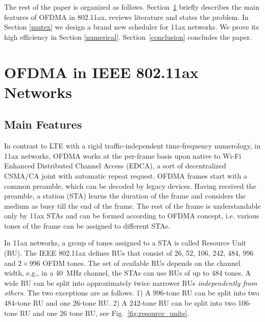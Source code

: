 The rest of the paper is organized as follows.
Section~\ref{sec:ofdma} briefly describes the main features of OFDMA in 802.11ax, reviews literature and states the problem.
In Section \ref{mutex} we design a brand new scheduler for 11ax networks.
We prove its high efficiency in Section \ref{numerical}.
Section~\ref{conclusion} concludes the paper. 

     

\section{OFDMA in IEEE 802.11ax Networks}
\label{sec:ofdma}
\subsection{Main Features}
\label{mainfeatures}




In contrast to LTE with a rigid traffic-independent time-frequency numerology, in 11ax networks, OFDMA works at the per-frame basis upon native to Wi-Fi Enhanced Distributed Channel Access (EDCA), a sort of decentralized CSMA/CA joint with automatic repeat request.
OFDMA frames start with a common preamble, which can be decoded by legacy devices.
Having received the preamble, a station (STA) learns the duration of the frame and considers the medium as busy till the end of the frame.
The rest of the frame is understandable only by 11ax STAs and can be formed according to OFDMA concept, i.e. various tones of the frame can be assigned to different STAs. 

In 11ax networks, a group of tones assigned to a STA is called Resource Unit (RU).
The IEEE 802.11ax defines RUs that consist of 26, 52, 106, 242, 484, 996 and $2\times996$ OFDM tones.
The set of available RUs depends on the channel width, e.g., in a \SI{40}{\MHz} channel, the STAs can use RUs of up to 484 tones.
A wide RU can be split into approximately twice narrower RUs \textit{independently from others}. The two exceptions are as follows.
1) A 996-tone RU can be split into two 484-tone RU and one 26-tone RU.
2) A 242-tone RU can be split into two 106-tone RU and one 26 tone RU, see Fig.~\ref{fig:resource_units}.

